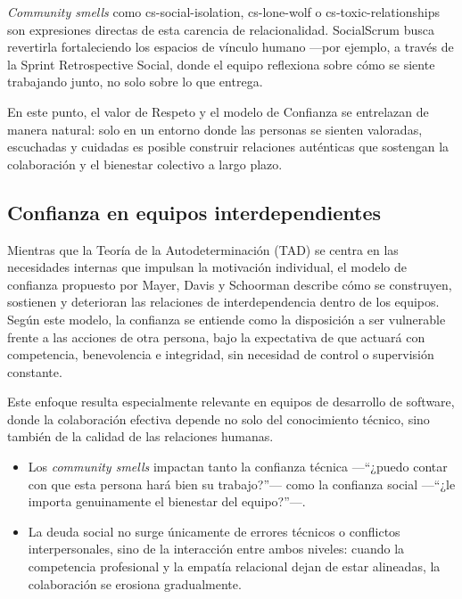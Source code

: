 \textit{Community smells} como \gls{cs-social-isolation}, \gls{cs-lone-wolf} o \gls{cs-toxic-relationships} son expresiones directas de esta carencia de relacionalidad.
SocialScrum busca revertirla fortaleciendo los espacios de vínculo humano —por ejemplo, a través de la Sprint Retrospective Social, donde el equipo reflexiona sobre cómo se siente trabajando junto, no solo sobre lo que entrega.

En este punto, el valor de Respeto y el modelo de Confianza se entrelazan de manera natural: solo en un entorno donde las personas se sienten valoradas, escuchadas y cuidadas es posible construir relaciones auténticas que sostengan la colaboración y el bienestar colectivo a largo plazo.

\subsection{Confianza en equipos interdependientes}

Mientras que la Teoría de la Autodeterminación (TAD) se centra en las necesidades internas que impulsan la motivación individual, el modelo de confianza propuesto por Mayer, Davis y Schoorman \cite{mayer_integrative_1995} describe cómo se construyen, sostienen y deterioran las relaciones de interdependencia dentro de los equipos.
Según este modelo, la confianza se entiende como la disposición a ser vulnerable frente a las acciones de otra persona, bajo la expectativa de que actuará con competencia, benevolencia e integridad, sin necesidad de control o supervisión constante.

Este enfoque resulta especialmente relevante en equipos de desarrollo de software, donde la colaboración efectiva depende no solo del conocimiento técnico, sino también de la calidad de las relaciones humanas.

\begin{itemize}
    \item Los \textit{community smells} impactan tanto la confianza técnica —``¿puedo contar con que esta persona hará bien su trabajo?''— como la confianza social —``¿le importa genuinamente el bienestar del equipo?''—.
    \item La deuda social no surge únicamente de errores técnicos o conflictos interpersonales, sino de la interacción entre ambos niveles: cuando la competencia profesional y la empatía relacional dejan de estar alineadas, la colaboración se erosiona gradualmente.
\end{itemize}

